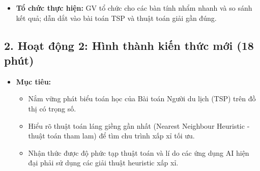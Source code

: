 \documentclass[12pt, a4paper]{article}
\begin{document}
\begin{itemize}[leftmargin=1.2cm]
    \item[d)] \textbf{Tổ chức thực hiện:} GV tổ chức cho các bàn tính nhẩm nhanh và so sánh kết quả; dẫn dắt vào bài toán TSP và thuật toán giải gần đúng.
\end{itemize}

\subsection*{2. Hoạt động 2: Hình thành kiến thức mới (18 phút)}

\begin{itemize}[leftmargin=1.2cm]
    \item[a)] \textbf{Mục tiêu:}
    \begin{itemize}[leftmargin=0.6cm]
        \item Nắm vững phát biểu toán học của Bài toán Người du lịch (TSP) trên đồ thị có trọng số.
        \item Hiểu rõ thuật toán láng giềng gần nhất (Nearest Neighbour Heuristic - thuật toán tham lam) để tìm chu trình xấp xỉ tối ưu.
        \item Nhận thức được độ phức tạp thuật toán và lí do các ứng dụng AI hiện đại phải sử dụng các giải thuật heuristic xấp xỉ.
    \end{itemize}


\end{itemize}
\end{document}
